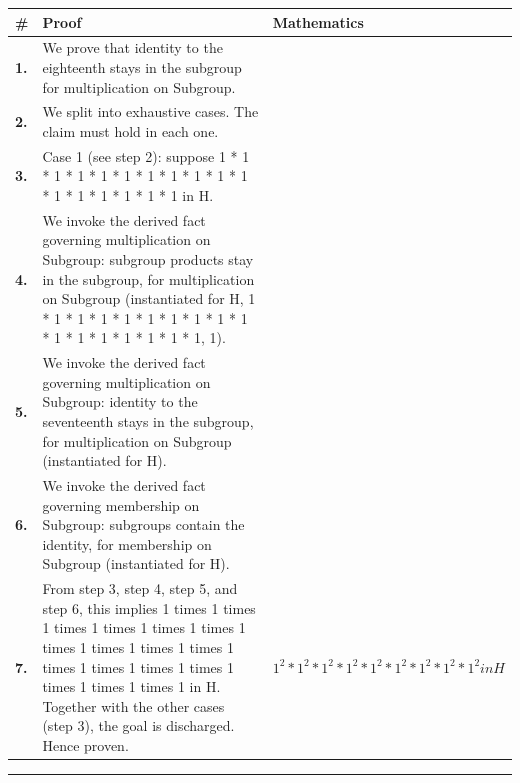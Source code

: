 \documentclass[11pt]{article}
\theoremstyle{definition}
\begin{document}
\begin{tabular}{@{} >{\raggedright\arraybackslash}p{} >{\raggedright\arraybackslash}p{} >{\raggedleft\arraybackslash}p{} @{}}
\textbf{\#} & \textbf{Proof} & \textbf{Mathematics} \\
\midrule
\textbf{1.} & We prove that identity to the eighteenth stays in the subgroup for multiplication on Subgroup. & \\[0.45em]
\textbf{2.} & We split into exhaustive cases. The claim must hold in each one. & \\[0.45em]
\textbf{3.} & Case 1 (see step 2): suppose 1 * 1 * 1 * 1 * 1 * 1 * 1 * 1 * 1 * 1 * 1 * 1 * 1 * 1 * 1 * 1 * 1 in H. & \\[0.45em]
\textbf{4.} & We invoke the derived fact governing multiplication on Subgroup: subgroup products stay in the subgroup, for multiplication on Subgroup (instantiated for H, 1 * 1 * 1 * 1 * 1 * 1 * 1 * 1 * 1 * 1 * 1 * 1 * 1 * 1 * 1 * 1 * 1, 1). & \\[0.45em]
\textbf{5.} & We invoke the derived fact governing multiplication on Subgroup: identity to the seventeenth stays in the subgroup, for multiplication on Subgroup (instantiated for H). & \\[0.45em]
\textbf{6.} & We invoke the derived fact governing membership on Subgroup: subgroups contain the identity, for membership on Subgroup (instantiated for H). & \\[0.45em]
\textbf{7.} & From step 3, step 4, step 5, and step 6, this implies 1 times 1 times 1 times 1 times 1 times 1 times 1 times 1 times 1 times 1 times 1 times 1 times 1 times 1 times 1 times 1 times 1 times 1 in H. Together with the other cases (step 3), the goal is discharged. Hence proven. & $\displaystyle 1^{2} * 1^{2} * 1^{2} * 1^{2} * 1^{2} * 1^{2} * 1^{2} * 1^{2} * 1^{2} in H$ \\[0.45em]
\bottomrule
\end{tabular}
\label{thm:Subgroup-multiplication-identity_to_the_eighteenth_stays_in_the_subgroup}
\par\medskip\hrule
\end{document}

